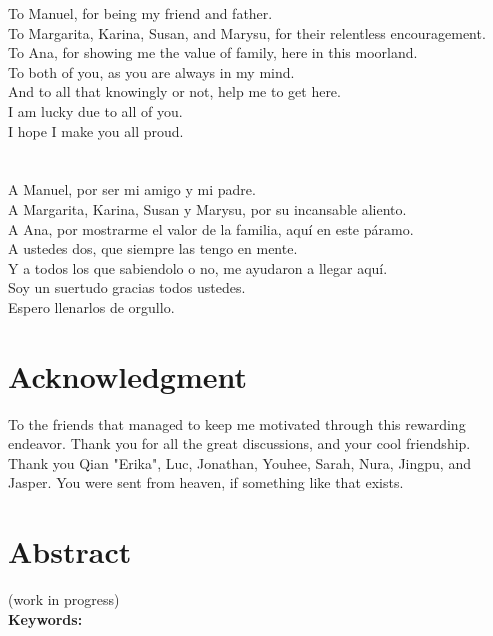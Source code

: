 \documentclass[12pt,a4paper,oneside]{book}
\begin{document}
\noindent To Manuel, for being my friend and father. \\
To Margarita, Karina, Susan, and Marysu, for their relentless encouragement. \\
To Ana, for showing me the value of family, here in this moorland. \\
To both of you, as you are always in my mind. \\
And to all that knowingly or not, help me to get here.\\
I am lucky due to all of you. \\
I hope I make you all proud. \\ \\ \\
%
%
\noindent A Manuel, por ser mi amigo y mi padre. \\
A Margarita, Karina, Susan y Marysu, por su incansable aliento. \\
A Ana, por mostrarme el valor de la familia, aqu\'i en este p\'aramo.\\
A ustedes dos, que siempre las tengo en mente. \\
Y a todos los que sabiendolo o no, me ayudaron a llegar aqu\'i.\\
Soy un suertudo gracias todos ustedes. \\
Espero llenarlos de orgullo.
%
%
\chapter*{Acknowledgment}
%
To the friends that managed to keep me motivated through this rewarding endeavor. Thank you for all the great discussions, and your cool friendship. Thank you Qian "Erika", Luc, Jonathan, Youhee, Sarah, Nura, Jingpu, and Jasper. You were sent from heaven, if something like that exists.
%
%
\chapter*{Abstract}
{\color{red}(work in progress)} \\
%
\noindent \textbf{Keywords:} 
%
%
\tableofcontents    					%
%
%
\listoffigures		%
\listoftables		%
%
%
\end{document}
